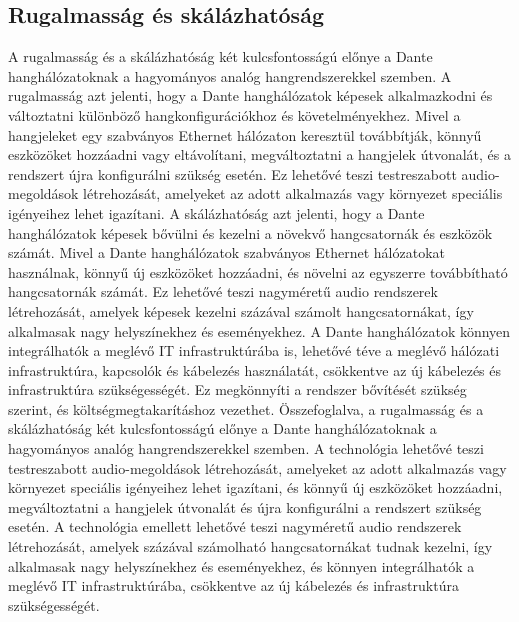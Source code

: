 \subsection{Rugalmasság és skálázhatóság}
A rugalmasság és a skálázhatóság két kulcsfontosságú előnye a Dante
hanghálózatoknak a hagyományos analóg hangrendszerekkel szemben. A rugalmasság
azt jelenti, hogy a Dante hanghálózatok képesek alkalmazkodni és változtatni
különböző hangkonfigurációkhoz és követelményekhez. Mivel a hangjeleket egy
szabványos Ethernet hálózaton keresztül továbbítják, könnyű eszközöket hozzáadni
vagy eltávolítani, megváltoztatni a hangjelek útvonalát, és a rendszert újra
konfigurálni szükség esetén. Ez lehetővé teszi testreszabott audio-megoldások
létrehozását, amelyeket az adott alkalmazás vagy környezet speciális igényeihez
lehet igazítani. A skálázhatóság azt jelenti, hogy a Dante hanghálózatok képesek
bővülni és kezelni a növekvő hangcsatornák és eszközök számát. Mivel a Dante
hanghálózatok szabványos Ethernet hálózatokat használnak, könnyű új eszközöket
hozzáadni, és növelni az egyszerre továbbítható hangcsatornák számát. Ez
lehetővé teszi nagyméretű audio rendszerek létrehozását, amelyek képesek kezelni
százával számolt hangcsatornákat, így alkalmasak nagy helyszínekhez és
eseményekhez. A Dante hanghálózatok könnyen integrálhatók a meglévő IT
infrastruktúrába is, lehetővé téve a meglévő hálózati infrastruktúra, kapcsolók
és kábelezés használatát, csökkentve az új kábelezés és infrastruktúra
szükségességét. Ez megkönnyíti a rendszer bővítését szükség szerint, és
költségmegtakarításhoz vezethet. Összefoglalva, a rugalmasság és a skálázhatóság
két kulcsfontosságú előnye a Dante hanghálózatoknak a hagyományos analóg
hangrendszerekkel szemben. A technológia lehetővé teszi testreszabott
audio-megoldások létrehozását, amelyeket az adott alkalmazás vagy környezet
speciális igényeihez lehet igazítani, és könnyű új eszközöket hozzáadni,
megváltoztatni a hangjelek útvonalát és újra konfigurálni a rendszert szükség
esetén. A technológia emellett lehetővé teszi nagyméretű audio rendszerek
létrehozását, amelyek százával számolható hangcsatornákat tudnak kezelni, így
alkalmasak nagy helyszínekhez és eseményekhez, és könnyen integrálhatók a
meglévő IT infrastruktúrába, csökkentve az új kábelezés és infrastruktúra
szükségességét.






